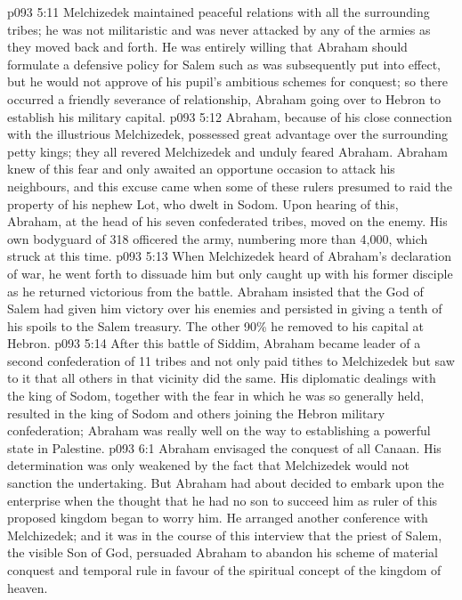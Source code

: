 \vs p093 5:11 Melchizedek maintained peaceful relations with all the surrounding tribes; he was not militaristic and was never attacked by any of the armies as they moved back and forth. He was entirely willing that Abraham should formulate a defensive policy for Salem such as was subsequently put into effect, but he would not approve of his pupil’s ambitious schemes for conquest; so there occurred a friendly severance of relationship, Abraham going over to Hebron to establish his military capital.
\vs p093 5:12 Abraham, because of his close connection with the illustrious Melchizedek, possessed great advantage over the surrounding petty kings; they all revered Melchizedek and unduly feared Abraham. Abraham knew of this fear and only awaited an opportune occasion to attack his neighbours, and this excuse came when some of these rulers presumed to raid the property of his nephew Lot, who dwelt in Sodom. Upon hearing of this, Abraham, at the head of his seven confederated tribes, moved on the enemy. His own bodyguard of 318 officered the army, numbering more than 4,000, which struck at this time.
\vs p093 5:13 When Melchizedek heard of Abraham’s declaration of war, he went forth to dissuade him but only caught up with his former disciple as he returned victorious from the battle. Abraham insisted that the God of Salem had given him victory over his enemies and persisted in giving a tenth of his spoils to the Salem treasury. The other 90\% he removed to his capital at Hebron.
\vs p093 5:14 After this battle of Siddim, Abraham became leader of a second confederation of 11 tribes and not only paid tithes to Melchizedek but saw to it that all others in that vicinity did the same. His diplomatic dealings with the king of Sodom, together with the fear in which he was so generally held, resulted in the king of Sodom and others joining the Hebron military confederation; Abraham was really well on the way to establishing a powerful state in Palestine.
\vs p093 6:1 Abraham envisaged the conquest of all Canaan. His determination was only weakened by the fact that Melchizedek would not sanction the undertaking. But Abraham had about decided to embark upon the enterprise when the thought that he had no son to succeed him as ruler of this proposed kingdom began to worry him. He arranged another conference with Melchizedek; and it was in the course of this interview that the priest of Salem, the visible Son of God, persuaded Abraham to abandon his scheme of material conquest and temporal rule in favour of the spiritual concept of the kingdom of heaven.

